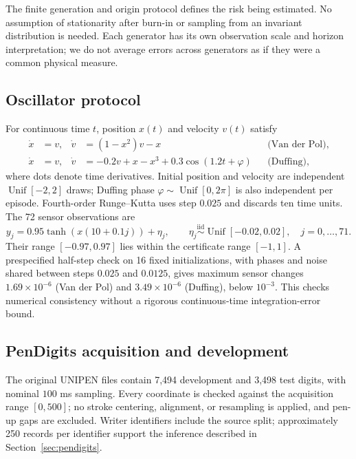 The finite generation and origin protocol defines the risk being estimated.
No assumption of stationarity after burn-in or sampling from an invariant
distribution is needed. Each generator has its own observation scale and
horizon interpretation; we do not average errors across generators as if they
were a common physical measure.

\subsection{Oscillator protocol}
\label{app:oscillator-protocol}

For continuous time $t$, position $x(t)$ and velocity $v(t)$ satisfy
\begin{align*}
 \dot x&=v,& \dot v&=(1-x^2)v-x &&\text{(Van der Pol)},\\
 \dot x&=v,& \dot v&=-0.2v+x-x^3+0.3\cos(1.2t+\varphi)
 &&\text{(Duffing)},
\end{align*}
where dots denote time derivatives. Initial position and velocity are
independent $\operatorname{Unif}[-2,2]$ draws; Duffing phase
$\varphi\sim\operatorname{Unif}[0,2\pi]$ is also independent per episode.
Fourth-order Runge--Kutta uses step $0.025$ and discards ten time units.
The 72 sensor observations are
\[
 y_j=0.95\tanh(x(10+0.1j))+\eta_j,\qquad
 \eta_j\stackrel{\mathrm{iid}}{\sim}\operatorname{Unif}[-0.02,0.02],
 \quad j=0,\ldots,71.
\]
Their range $[-0.97,0.97]$ lies within the certificate range $[-1,1]$.
A prespecified half-step check on 16 fixed initializations, with phases and
noise shared between steps $0.025$ and $0.0125$, gives maximum sensor
changes $1.69\times10^{-6}$ (Van der Pol) and $3.49\times10^{-6}$ (Duffing),
below $10^{-3}$. This checks numerical consistency without a rigorous
continuous-time integration-error bound.

\subsection{PenDigits acquisition and development}
\label{app:pendigits-protocol}

The original UNIPEN files contain 7,494 development and 3,498 test digits,
with nominal $100$ ms sampling. Every coordinate is checked against the
acquisition range $[0,500]$; no stroke centering, alignment, or resampling is
applied, and pen-up gaps are excluded. Writer identifiers include the source
split; approximately 250 records per identifier support the inference
described in Section~\ref{sec:pendigits}.

